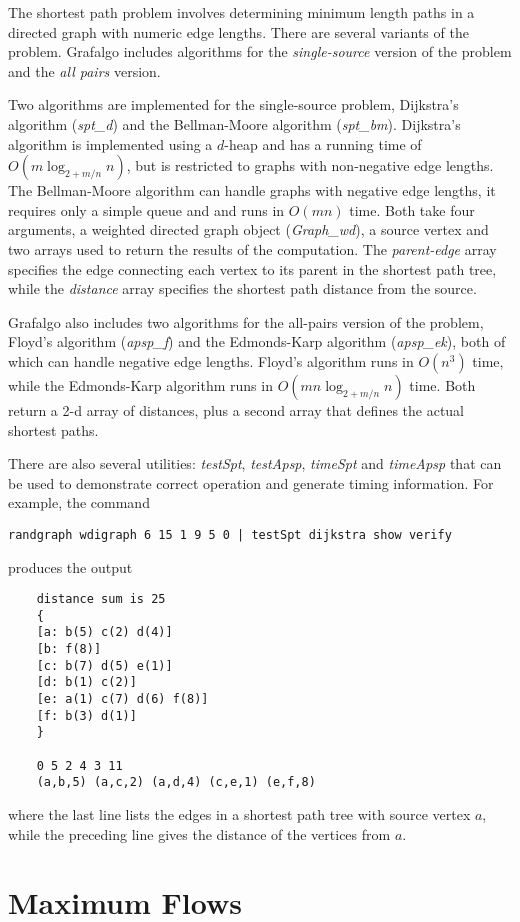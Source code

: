 \documentclass[11pt]{article}
\begin{document}
The shortest path problem involves determining minimum length paths in a directed graph
with numeric edge lengths. There are several variants of the problem. Grafalgo includes
algorithms for the {\sl single-source} version of the problem and the {\sl all pairs} version.

Two algorithms are implemented for the single-source problem, Dijkstra's algorithm ({\sl spt\_d})
and the Bellman-Moore algorithm ({\sl spt\_bm}).
Dijkstra's algorithm is implemented using a $d$-heap and has a running time of 
$O(m \log_{2+m/n} n)$, but is restricted to graphs with non-negative edge lengths. 
The Bellman-Moore algorithm can handle graphs with negative edge lengths,
it requires only a simple queue and and runs in  $O(mn)$ time.
Both take four arguments, a weighted directed graph object ({\sl Graph\_wd}), a source vertex
and two arrays used to return the results of the computation.
The {\sl parent-edge} array specifies the edge connecting each vertex to its parent in the 
shortest path tree,
while the {\sl distance} array specifies the shortest path distance from the source.

Grafalgo also includes two algorithms for the all-pairs version of the problem,
Floyd's algorithm ({\sl apsp\_f}) and the Edmonds-Karp algorithm ({\sl apsp\_ek}),
both of which can handle negative edge lengths.
Floyd's algorithm runs in $O(n^3)$ time, 
while the Edmonds-Karp algorithm runs
in $O(mn\log_{2+m/n} n)$ time.
Both return a 2-d array of distances, 
plus a second array that defines the actual shortest paths.

There are also several utilities: {\sl testSpt}, {\sl testApsp}, {\sl timeSpt} and {\sl timeApsp}
that can be used to demonstrate correct operation and generate timing information.
For example, the command
\begin{verbatim}
randgraph wdigraph 6 15 1 9 5 0 | testSpt dijkstra show verify
\end{verbatim}
produces the output
\begin{verbatim}
    distance sum is 25
    {
    [a: b(5) c(2) d(4)]
    [b: f(8)]
    [c: b(7) d(5) e(1)]
    [d: b(1) c(2)]
    [e: a(1) c(7) d(6) f(8)]
    [f: b(3) d(1)]
    }

    0 5 2 4 3 11 
    (a,b,5) (a,c,2) (a,d,4) (c,e,1) (e,f,8)
\end{verbatim}
where the last line lists the edges in a shortest path tree with source vertex $a$,
while the preceding line gives the distance of the vertices from $a$.

\section{Maximum Flows}
\end{document}
